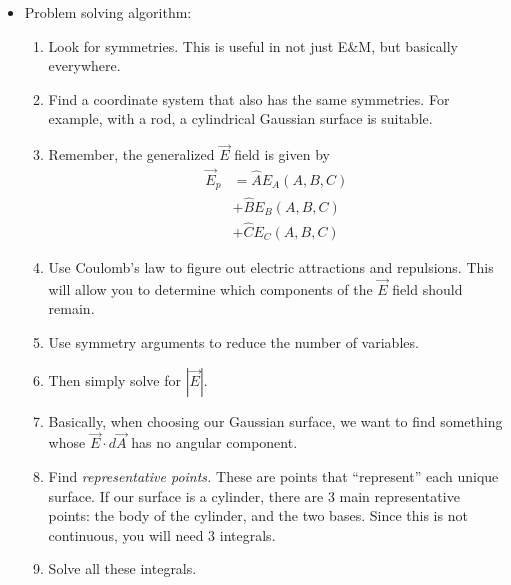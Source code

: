 \documentclass[12pt]{extreport}
\begin{document}
\begin{itemize}
		\item Problem solving algorithm:
			\begin{enumerate}
				\item Look for symmetries. This is useful in not just E\&M, but basically everywhere.

				\item Find a coordinate system that also has the same symmetries. For example, with a rod, a cylindrical Gaussian surface is suitable.

				\item Remember, the generalized $\vec E$ field is given by 
				\begin{align*}
					\vec E_p &= \hat A E_A(A, B, C) \\
							 &+ \hat B E_B(A, B, C) \\
							 &+ \hat C E_C(A, B, C)
				\end{align*}

				\item Use Coulomb's law to figure out electric attractions and repulsions. This will allow you to determine which components of the $\vec E$ field should remain.

				\item Use symmetry arguments to reduce the number of variables.

				\item Then simply solve for $|\vec E|.$

				\item Basically, when choosing our Gaussian surface, we want to find something whose $\vec E \cdot d \vec A$ has no angular component.

				\item Find \textit{representative points.} These are points that ``represent'' each unique surface. If our surface is a cylinder, there are 3 main representative points: the body of the cylinder, and the two bases. Since this is not continuous, you will need 3 integrals.

				\item Solve all these integrals.
			\end{enumerate} 
	\end{itemize}
\end{document}
